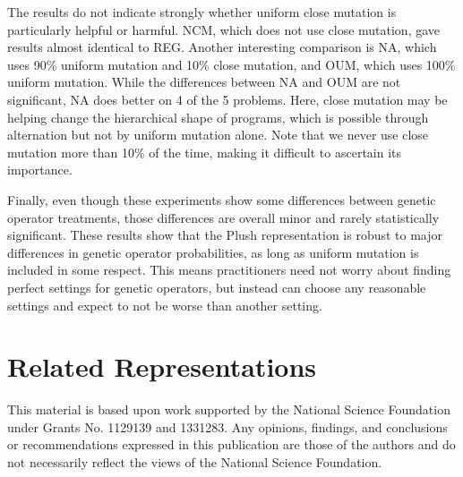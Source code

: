 The results do not indicate strongly whether uniform close mutation is particularly helpful or harmful. NCM, which does not use close mutation, gave results almost identical to REG. Another interesting comparison is NA, which uses 90\% uniform mutation and 10\% close mutation, and OUM, which uses 100\% uniform mutation. While the differences between NA and OUM are not significant, NA does better on 4 of the 5 problems. Here, close mutation may be helping change the hierarchical shape of programs, which is possible through alternation but not by uniform mutation alone. Note that we never use close mutation more than 10\% of the time, making it difficult to ascertain its importance.

Finally, even though these experiments show some differences between genetic operator treatments, those differences are overall minor and rarely statistically significant. These results show that the Plush representation is robust to major differences in genetic operator probabilities, as long as uniform mutation is included in some respect. This means practitioners need not worry about finding perfect settings for genetic operators, but instead can choose any reasonable settings and expect to not be worse than another setting.


\section{Related Representations}







\begin{acknowledgement}
This material is based upon work supported by the National Science Foundation under Grants No. 1129139 and 1331283. Any opinions, findings, and conclusions or recommendations expressed in this publication are those of the authors and do not necessarily reflect the views of the National Science Foundation.
\end{acknowledgement}
%




